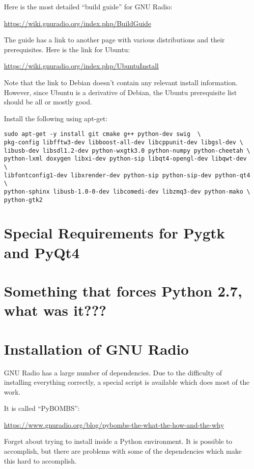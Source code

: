 \documentclass[oneside,letterpaper,12pt]{book}
\begin{document}
Here is the most detailed ``build guide'' for GNU Radio:

\url{https://wiki.gnuradio.org/index.php/BuildGuide}

The guide has a link to another page with various distributions and their prerequisites.
Here is the link for Ubuntu:

\url{https://wiki.gnuradio.org/index.php/UbuntuInstall}

Note that the link to Debian doesn't contain any relevant install information.
However, since Ubuntu is a derivative of Debian, the Ubuntu prerequisite list
should be all or mostly good.

Install the following using apt-get:

\begin{verbatim}
sudo apt-get -y install git cmake g++ python-dev swig  \
pkg-config libfftw3-dev libboost-all-dev libcppunit-dev libgsl-dev \
libusb-dev libsdl1.2-dev python-wxgtk3.0 python-numpy python-cheetah \
python-lxml doxygen libxi-dev python-sip libqt4-opengl-dev libqwt-dev \
libfontconfig1-dev libxrender-dev python-sip python-sip-dev python-qt4 \
python-sphinx libusb-1.0-0-dev libcomedi-dev libzmq3-dev python-mako \
python-gtk2
\end{verbatim}


\section{Special Requirements for Pygtk and PyQt4}



\section{Something that forces Python 2.7, what was it???}

\section{Installation of GNU Radio}

GNU Radio has a large number of dependencies.  Due to the difficulty of installing everything correctly, a special script is available which does most of the work.

It is called ``PyBOMBS'':

\url{https://www.gnuradio.org/blog/pybombs-the-what-the-how-and-the-why}

Forget about trying to install inside a Python environment.  It is possible to
accomplish, but there are problems with some of the dependencies which make
this hard to accomplish.
\end{document}
